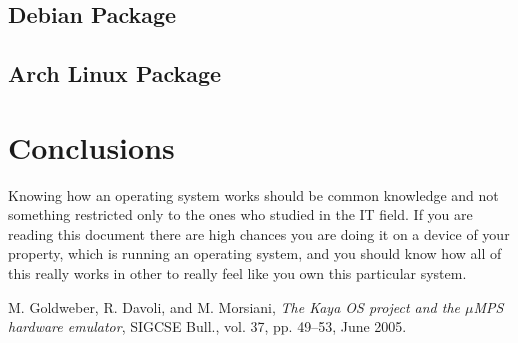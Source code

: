 \documentclass[12pt,a4paper,openright,twoside]{report}
\begin{document}
\section{Debian Package}
\section{Arch Linux Package}
\chapter{Conclusions}
\lhead[\fancyplain{}{\bfseries\thepage}]{\fancyplain{}{\bfseries\rightmark}}
Knowing how an operating system works should be common knowledge and not something restricted  only to the ones who studied in the IT field.
If you are reading this document there are high chances you are doing it on a device of your property, which is running an operating system, and you should know how all of this really works in other to really feel like you own this particular system.
\begin{thebibliography}{99}
  M. Goldweber, R. Davoli, and M. Morsiani,
  \textit{The Kaya OS project and the $\mu$MPS hardware emulator},
   SIGCSE Bull.,
   vol. 37, pp. 49–53,
   June 2005.
\end{thebibliography}
\end{document}
